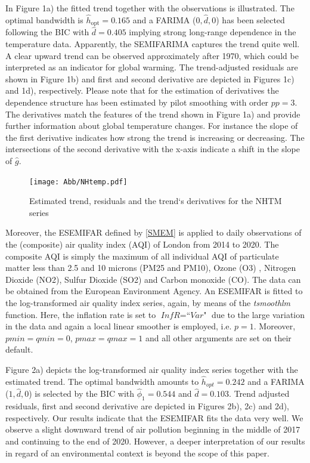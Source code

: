 \documentclass[12pt]{article}
\begin{document}
In Figure 1a) the fitted trend together with the observations is illustrated. The optimal bandwidth is $\hat{h}_{\text{opt}} = 0.165$ and a FARIMA ($0, \hat{d}, 0$) has been selected following the BIC with $\hat{d} = 0.405$ implying strong long-range dependence in the temperature data. Apparently, the SEMIFARIMA captures the trend quite well. A clear upward trend can be observed approximately after 1970, which could be interpreted as an indicator for global warming. The trend-adjusted residuals are shown in Figure 1b) and first and second derivative are depicted in Figures 1c) and 1d), respectively. Please note that for the estimation of derivatives the dependence structure has been estimated by pilot smoothing with order $\textit{pp} = 3$. The derivatives match the features of the trend shown in Figure 1a) and provide further information about global temperature changes. For instance the slope of the first derivative indicates how strong the trend is increasing or decreasing. The intersections of the second derivative with the x-axis indicate a shift in the slope of $\hat{g}$. 
 
\begin{figure}[!h]
		\texttt{[image: Abb/NHtemp.pdf]}
		\caption{Estimated trend, residuals and the trend`s derivatives for the NHTM series}
\end{figure}

Moreover, the ESEMIFAR defined by \eqref{SMEM} is applied to daily observations of the (composite) air quality index (AQI) of London from 2014 to 2020. The composite AQI is simply the maximum of all individual AQI of particulate matter less than 2.5 and 10 microns (PM25 and PM10), Ozone (O3) , Nitrogen Dioxide (NO2), Sulfur Dioxide (SO2) and Carbon monoxide (CO). The data can be obtained from the European Environment Agency. An ESEMIFAR is fitted to the log-transformed air quality index series, again, by means of the \textit{tsmoothlm} function. Here, the inflation rate is set to $\textit{InfR} = \textit{``Var"}$ due to the large variation in the data and again a local linear smoother is employed, i.e. $p = 1$. Moreover, $\textit{pmin} = \textit{qmin} = 0$, $\textit{pmax} = \textit{qmax} = 1$ and all other arguments are set on their default.
 

Figure 2a) depicts the log-transformed air quality index series together with the estimated trend. The optimal bandwidth amounts to $\hat{h}_{opt} = 0.242$ and a FARIMA ($1, \hat{d}, 0$) is selected by the BIC with $\hat{\phi}_1 = 0.544$ and $\hat{d} = 0.103$. Trend adjusted residuals, first and second derivative are depicted in Figures 2b), 2c) and 2d), respectively. Our results indicate that the ESEMIFAR fits the data very well. We observe a slight downward trend of air pollution beginning in the middle of 2017 and continuing to the end of 2020. However, a deeper interpretation of our results in regard of an environmental context is beyond the scope of this paper.    
\end{document}
